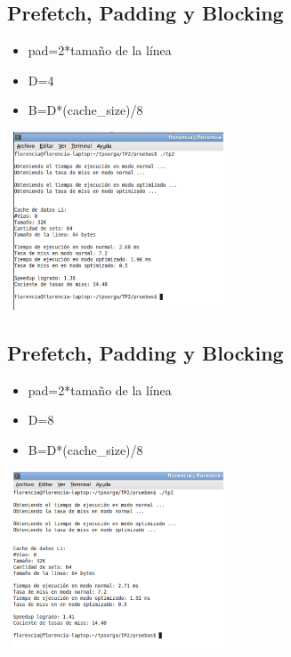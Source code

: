 \documentclass[a4paper,10pt]{article}
\begin{document}
\subsection*{Prefetch, Padding y Blocking}
\begin{itemize}
\item pad=2*tama\~no de la l\'inea
\item D=4
\item B=D*(cache\_size)/8
\end{itemize}

\begin{center}
 \includegraphics[width=250px,height=200px,bb=0 0 328 277,scale=1]{./ssh8.png}
\end{center}


\subsection*{Prefetch, Padding y Blocking}
\begin{itemize}
\item pad=2*tama\~no de la l\'inea
\item D=8
\item B=D*(cache\_size)/8\end{itemize}
\begin{center}
 \includegraphics[width=250px,height=200px,bb=0 0 328 277,scale=1]{./ssh9.png}
\end{center}
\end{document}
